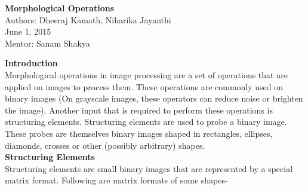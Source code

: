 \documentclass{article}
\begin{document}
	\begin{titlepage}
	
	\centering	
		\huge \textbf{Morphological Operations} \\
	\large
		Authors: Dheeraj Kamath, Niharika Jayanthi \\
		June 1, 2015 \\
		Mentor: Sanam Shakya \\
	
		
		\end{titlepage}
\begin{flushleft}
	\huge	\textbf{Introduction} \\
	 \large 
	\indent	Morphological operations in image processing are a set of operations that are applied on images to process them. These operations are commonly used on binary images (On grayscale images, these operators can reduce noise or brighten the image). Another input that is required to perform these operations is structuring elements. Structuring elements are used to probe a binary image. These probes are themselves binary images shaped in rectangles, ellipses, diamonds, crosses or other (possibly arbitrary) shapes. \\
	
	\huge \textbf{Structuring Elements} \\
	\large
	Structuring elements are small binary images that are represented by a special matrix format. Following are matrix formats of some shapes- \\
	

\end{flushleft}
\end{document}
